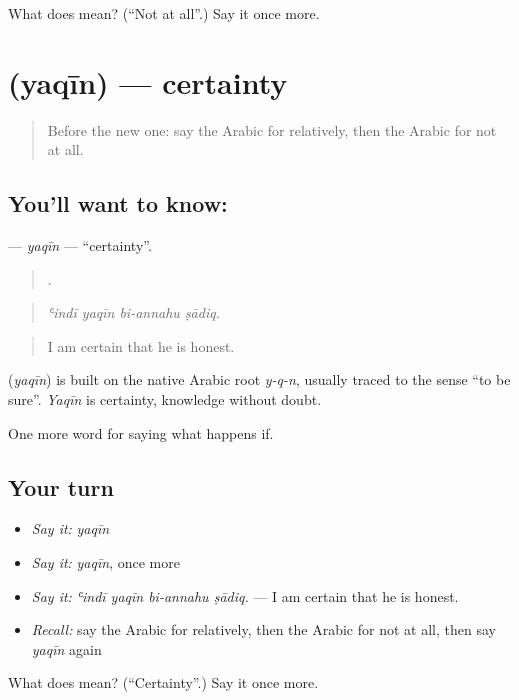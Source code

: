 \begin{tcolorbox}[breakable,colback=teal!4,colframe=teal!35!black,title={Before you move on}]
What does  mean? (\textquotedblleft{}Not at all\textquotedblright{}.) Say it once more.
\end{tcolorbox}
\section[\texorpdfstring{\ar{يقين} (yaqīn)}{يقين (yaqīn)}]{ (yaqīn) — certainty}

\label{lesson:AR-C402-yaqin}



\begin{quote}
Before the new one: say the Arabic for relatively, then the Arabic for not at all.
\end{quote}

\subsection*{You'll want to know: }
\textbf{} — \emph{yaqīn} — \textquotedblleft{}certainty\textquotedblright{}.

\begin{quote}
   .
\end{quote}

\begin{quote}
\emph{ʿindī yaqīn bi-annahu ṣādiq.}
\end{quote}

\begin{quote}
I am certain that he is honest.
\end{quote}

\begin{cousinweb}
\textbf{} (\emph{yaqīn}) is built on the native Arabic root \emph{y-q-n}, usually traced to the sense \textquotedblleft{}to be sure\textquotedblright{}. \emph{Yaqīn} is certainty, knowledge without doubt.
\end{cousinweb}

\begin{grammarlens}[title={What you've built}]
One more word for saying what happens if.
\end{grammarlens}

\subsection*{Your turn}
\begin{itemize}
\raggedright
  \item \emph{Say it:} \emph{yaqīn}
  \item \emph{Say it:} \emph{yaqīn}, once more
  \item \emph{Say it:} \emph{ʿindī yaqīn bi-annahu ṣādiq.} — I am certain that he is honest.
  \item \emph{Recall:} say the Arabic for relatively, then the Arabic for not at all, then say \emph{yaqīn} again
\end{itemize}

\begin{tcolorbox}[breakable,colback=teal!4,colframe=teal!35!black,title={Before you move on}]
What does  mean? (\textquotedblleft{}Certainty\textquotedblright{}.) Say it once more.
\end{tcolorbox}
